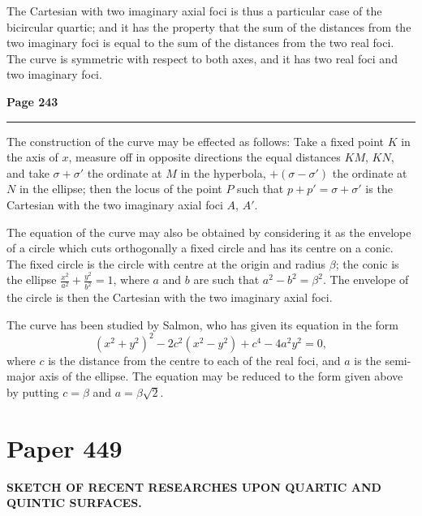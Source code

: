 \documentclass[12pt,a4paper]{article}
\theoremstyle{plain}
\theoremstyle{definition}
\theoremstyle{remark}
\begin{document}
\noindent The Cartesian with two imaginary axial foci is thus a particular case of the bicircular quartic; and it has the property that the sum of the distances from the two imaginary foci is equal to the sum of the distances from the two real foci. The curve is symmetric with respect to both axes, and it has two real foci and two imaginary foci.

\newpage
\noindent\textbf{Page 243}\\
\noindent\rule{\textwidth}{0.4pt}

\smallskip

\noindent The construction of the curve may be effected as follows: Take a fixed point $K$ in the axis of $x$, measure off in opposite directions the equal distances $KM$, $KN$, and take $\sigma + \sigma'$ the ordinate at $M$ in the hyperbola, $+ (\sigma - \sigma')$ the ordinate at $N$ in the ellipse; then the locus of the point $P$ such that $p + p' = \sigma + \sigma'$ is the Cartesian with the two imaginary axial foci $A$, $A'$.

\noindent The equation of the curve may also be obtained by considering it as the envelope of a circle which cuts orthogonally a fixed circle and has its centre on a conic. The fixed circle is the circle with centre at the origin and radius $\beta$; the conic is the ellipse $\frac{x^2}{a^2} + \frac{y^2}{b^2} = 1$, where $a$ and $b$ are such that $a^2 - b^2 = \beta^2$. The envelope of the circle is then the Cartesian with the two imaginary axial foci.

\noindent The curve has been studied by Salmon, who has given its equation in the form
\[
(x^2 + y^2)^2 - 2c^2 (x^2 - y^2) + c^4 - 4a^2 y^2 = 0,
\]
where $c$ is the distance from the centre to each of the real foci, and $a$ is the semi-major axis of the ellipse. The equation may be reduced to the form given above by putting $c = \beta$ and $a = \beta \sqrt{2}$.

\newpage
\section*{Paper 449}

\begin{center}
\textbf{SKETCH OF RECENT RESEARCHES UPON QUARTIC AND QUINTIC SURFACES.}
\end{center}
\end{document}
